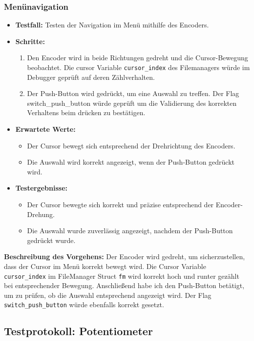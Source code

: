 \subsubsection{Menünavigation}
\begin{itemize}
    \item \textbf{Testfall:} Testen der Navigation im Menü mithilfe des Encoders.
    \item \textbf{Schritte:}
    \begin{enumerate}
        \item Den Encoder wird in beide Richtungen gedreht und die Cursor-Bewegung beobachtet. Die cursor Variable \texttt{cursor\_index} des Filemanagers würde im Debugger geprüft auf deren Zählverhalten.
        \item Der Push-Button wird gedrückt, um eine Auswahl zu treffen. Der Flag switch\_push\_button würde geprüft um die Validierung des korrekten Verhaltens beim drücken zu bestätigen.
    \end{enumerate}
    \item \textbf{Erwartete Werte:}
    \begin{itemize}
        \item Der Cursor bewegt sich entsprechend der Drehrichtung des Encoders.
        \item Die Auswahl wird korrekt angezeigt, wenn der Push-Button gedrückt wird.
    \end{itemize}

    \item \textbf{Testergebnisse:}
    \begin{itemize}
        \item Der Cursor bewegte sich korrekt und präzise entsprechend der Encoder-Drehung.
        \item Die Auswahl wurde zuverlässig angezeigt, nachdem der Push-Button gedrückt wurde.
    \end{itemize}
\end{itemize}

\textbf{Beschreibung des Vorgehens:} 
Der Encoder wird gedreht, um sicherzustellen, dass der Cursor im Menü korrekt bewegt wird. Die Cursor Variable \texttt{cursor\_index} im FileManager Struct \texttt{fm} wird korrekt hoch und runter gezählt bei entsprechender Bewegung. Anschließend habe ich den Push-Button betätigt, um zu prüfen, ob die Auswahl entsprechend angezeigt wird.  Der Flag \texttt{switch\_push\_button} würde ebenfalls korrekt gesetzt.


\subsection{Testprotokoll: Potentiometer}

